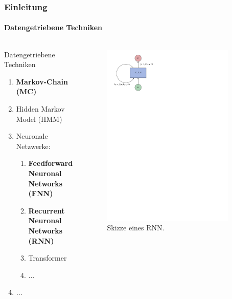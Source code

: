 \documentclass[aspectratio=169]{beamer}
\begin{document}
\begin{frame}
	\frametitle{Einleitung}
	\framesubtitle{Datengetriebene Techniken}
	\begin{columns}
		\begin{column}{0.6\textwidth}
		\begin{block}{Datengetriebene Techniken}
			\begin{enumerate}[label=$\bullet$]
				\item \textbf{Markov-Chain (MC)}
				\item Hidden Markov Model (HMM)
				\item Neuronale Netzwerke:
				\begin{enumerate}[label=$\circ$]
					\item \textbf{Feedforward Neuronal Networks (FNN)}
					\item \textbf{Recurrent Neuronal Networks (RNN)}
					\item Transformer
					\item $\ldots$
				\end{enumerate}
				\item $\ldots$
			\end{enumerate}
			\end{block}
		\end{column}
		
		\begin{column}{0.4\textwidth}
			\begin{figure}
				\includegraphics[width=0.9\textwidth]{rnn-diagram}
				\caption{Skizze eines RNN.}
				\label{fig:rnn-diagram}
			\end{figure}
		\end{column}
	\end{columns}
\end{frame}
	
\end{document}
